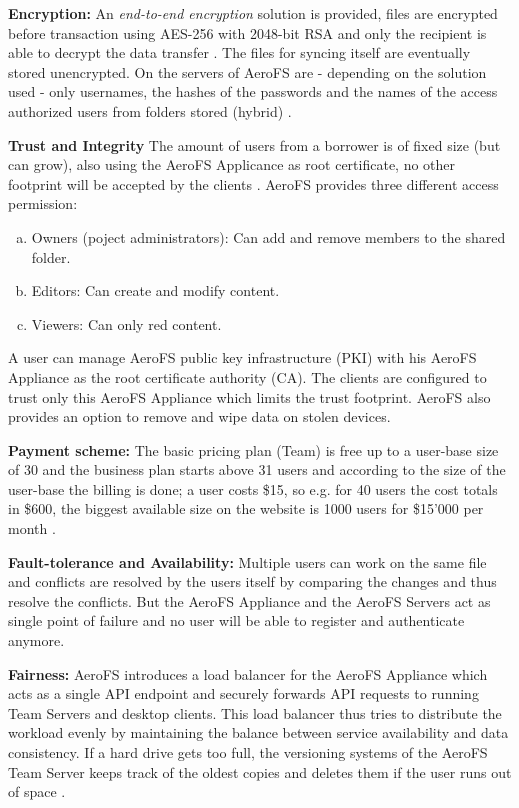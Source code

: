 \textbf{Encryption:} An \textit{end-to-end encryption} solution is provided, files are encrypted before transaction using AES-256 with 2048-bit RSA and only the recipient is able to decrypt the data transfer \cite{aerofs:security}. The files for syncing itself are eventually stored unencrypted. On the servers of AeroFS are - depending on the solution used - only usernames, the hashes of the passwords and the names of the access authorized users from folders stored (hybrid) \cite{aerofs:security_2}.

\textbf{Trust and Integrity} The amount of users from a borrower is of fixed size (but can grow), also using the AeroFS Applicance as root certificate, no other footprint will be accepted by the clients \cite{aerofs:security}. AeroFS provides three different access permission:
\begin{enumerate}[(a)]
\item Owners (poject administrators): Can add and remove members to the shared folder.
\item Editors: Can create and modify content.
\item Viewers: Can only red content.
\end{enumerate}
A user can manage AeroFS  public key infrastructure (PKI) with his AeroFS Appliance as the root certificate authority (CA). The clients are configured to trust only this AeroFS Appliance which limits the trust footprint. AeroFS also provides an option to remove and wipe data on stolen devices.

\textbf{Payment scheme:} The basic pricing plan (Team) is free up to a user-base size of 30 \cite{aerofs:blog:30_users_free} and the business plan starts above 31 users and according to the size of the user-base the billing is done; a user costs \$15, so e.g. for 40 users the cost totals in \$600, the biggest available size on the website is 1000 users for \$15'000 per month \cite{aerofs:pricing}.

\textbf{Fault-tolerance and Availability:} Multiple users can work on the same file and conflicts are resolved by the users itself by comparing the changes and thus resolve the conflicts. But the AeroFS Appliance and the AeroFS Servers act as single point of failure and no user will be able to register and authenticate anymore.

\textbf{Fairness:} AeroFS introduces a load balancer for the AeroFS Appliance which acts as a single API endpoint and securely forwards API requests to running Team Servers and desktop clients. This load balancer thus tries to distribute the workload evenly by maintaining the balance between service availability and data consistency.
If a hard drive gets too full, the versioning systems of the AeroFS Team Server keeps track of the oldest copies and deletes them if the user runs out of space \cite{aerofs:USTO.RE}.

